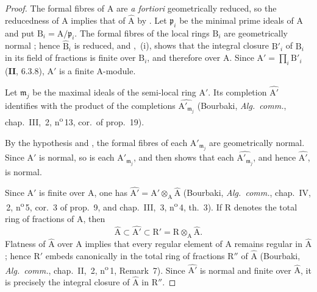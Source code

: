 \begin{proof}
The formal fibres of $\mathrm{A}$ are \emph{a fortiori} geometrically reduced, so the reducedness of $\mathrm{A}$ implies that of $\widehat{\mathrm{A}}$ by . Let $\mathfrak{p}_i$ be the minimal prime ideals of $\mathrm{A}$ and put $\mathrm{B}_i=\mathrm{A}/\mathfrak{p}_i$. The formal fibres of the local rings $\mathrm{B}_i$ are geometrically normal ; hence $\widehat{\mathrm{B}}_i$ is reduced, and ,~(i), shows that the integral closure $\mathrm{B}'_i$ of $\mathrm{B}_i$ in its field of fractions is finite over $\mathrm{B}_i$, and therefore over $\mathrm{A}$. Since $\mathrm{A}'=\prod_i\mathrm{B}'_i$ (\textbf{II}, $6.3.8$), $\mathrm{A}'$ is a finite $\mathrm{A}$-module.

Let $\mathfrak{m}_j$ be the maximal ideals of the semi-local ring $\mathrm{A}'$. Its completion $\widehat{\mathrm{A}'}$ identifies with the product of the completions $\widehat{\mathrm{A}'_{\mathfrak{m}_j}}$ (Bourbaki, \emph{Alg.\ comm.}, chap.~III, \textsection\,2, n\textsuperscript{o}\,13, cor.~of prop.~19).


By the hypothesis and , the formal fibres of each $\mathrm{A}'_{\mathfrak{m}_j}$ are geometrically normal. Since $\mathrm{A}'$ is normal, so is each $\mathrm{A}'_{\mathfrak{m}_j}$, and  then shows that each $\widehat{\mathrm{A}'_{\mathfrak{m}_j}}$, and hence $\widehat{\mathrm{A}'}$, is normal.

Since $\mathrm{A}'$ is finite over $\mathrm{A}$, one has $\widehat{\mathrm{A}'}=\mathrm{A}'\otimes_\mathrm{A}\widehat{\mathrm{A}}$ (Bourbaki, \emph{Alg.\ comm.}, chap.~IV, \textsection\,2, n\textsuperscript{o}\,5, cor.~3 of prop.~9, and chap.~III, \textsection\,3, n\textsuperscript{o}\,4, th.~3). If $\mathrm{R}$ denotes the total ring of fractions of $\mathrm{A}$, then
\[
  \widehat{\mathrm{A}}\subset\widehat{\mathrm{A}'}
  \subset \mathrm{R}'=\mathrm{R}\otimes_\mathrm{A}\widehat{\mathrm{A}}.
\]
Flatness of $\widehat{\mathrm{A}}$ over $\mathrm{A}$ implies that every regular element of $\mathrm{A}$ remains regular in $\widehat{\mathrm{A}}$; hence $\mathrm{R}'$ embeds canonically in the total ring of fractions $\mathrm{R}''$ of $\widehat{\mathrm{A}}$ (Bourbaki, \emph{Alg.\ comm.}, chap.~II, \textsection\,2, n\textsuperscript{o}\,1, Remark~7). Since $\widehat{\mathrm{A}'}$ is normal and finite over $\widehat{\mathrm{A}}$, it is precisely the integral closure of $\widehat{\mathrm{A}}$ in $\mathrm{R}''$.
\end{proof}

